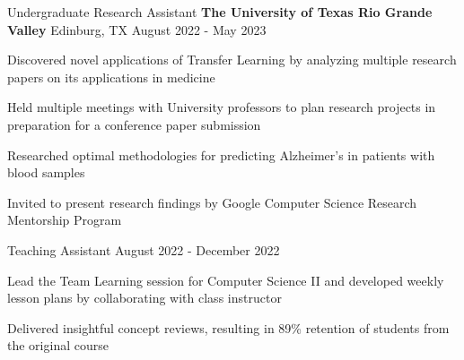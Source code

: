 \begin{cventries}

  \cventry
    {Undergraduate Research Assistant}
    {\textbf{The University of Texas Rio Grande Valley}}
    {Edinburg, TX}
    {August 2022 - May 2023}
    {
      \begin{cvitems}
        \item{Discovered novel applications of Transfer Learning by analyzing multiple research papers on its applications in medicine}
        \item{Held multiple meetings with University professors to plan research projects in preparation for a conference paper submission}
        \item{Researched optimal methodologies for predicting Alzheimer’s in patients with blood samples}
        \item{Invited to present research findings by Google Computer Science Research Mentorship Program}
      \end{cvitems}
    }

  \cventry
    {Teaching Assistant}
    {}
    {}
    {August 2022 - December 2022}
    {
      \begin{cvitems}
        \item{Lead the Team Learning session for Computer Science II and developed weekly lesson plans by collaborating with class instructor}
        \item{Delivered insightful concept reviews, resulting in 89\% retention of students from the original course}
      \end{cvitems}
    }

\end{cventries}
